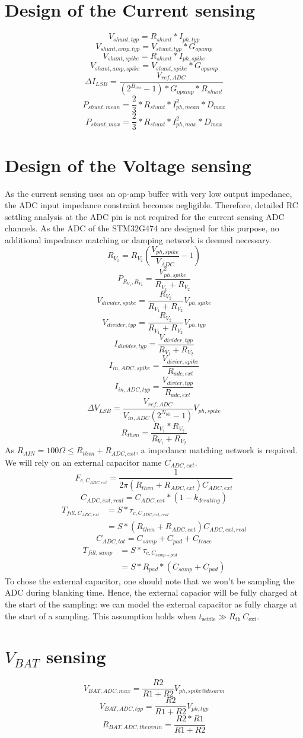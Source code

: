 \documentclass[a4paper, 10pt, conference]{IEEEtran} %
\begin{document}
 
\section{Design of the Current sensing}

\[
V_{shunt,typ} = R_{shunt} * I_{ph,typ}
\]
\[
V_{shunt,amp,typ} = V_{shunt,typ}*G_{opamp}
\]
\[
V_{shunt,spike} = R_{shunt} * I_{ph,spike}
\]
\[
V_{shunt,amp,spike} = V_{shunt,spike}*G_{opamp}
\]
\[
\Delta I_{LSB} = \frac{V_{ref,ADC}}{(2^{B_{res}}-1)*G_{opamp}*R_{shunt}}
\]
\[
P_{shunt,mean} = \frac{2}{3} * R_{shunt} * I_{ph,mean}^2 * D_{max}
\]
\[
P_{shunt,max} = \frac{2}{3} * R_{shunt} * I_{ph,max}^2 * D_{max}
\]

\section{Design of the Voltage sensing}

As the current sensing uses an op-amp buffer with very low output impedance, the ADC input impedance constraint becomes negligible. Therefore, detailed RC settling analysis at the ADC pin is not required for the current sensing ADC channels. As the ADC of the STM32G474 are designed for this purpose, no additional impedance matching or damping network is deemed necessary.
\[
R_{V_1} = R_{V_2}(\frac{V_{ph,spike}}{V_{ADC}} - 1)
\]
\[
P_{R_{V_1},R_{V_2}} = \frac{V_{ph,spike}^2}{R_{V_1}+R_{V_2}}
\]
\[
V_{divider,spike} = \frac{R_{V_2}}{R_{V_1}+R_{V_2}} V_{ph,spike}
\]
\[
V_{divider,typ} = \frac{R_{V_2}}{R_{V_1}+R_{V_2}} V_{ph,typ}
\]
\[
I_{divider,typ} = \frac{V_{divider,typ}}{R_{V_1}+R_{V_2}}
\]
\[
I_{in,ADC,spike} = \frac{V_{divier,spike}}{R_{adc,ext}}
\]
\[
I_{in,ADC,typ} = \frac{V_{divier,typ}}{R_{adc,ext}}
\]
\[
\Delta V_{LSB} = \frac{V_{ref,ADC}}{V_{in,ADC}(2^{N_{bit}}-1)}V_{ph,spike}
\]
\[
R_{thvn} = \frac{R_{V_1}*R_{V_2}}{R_{V_1}+R_{V_2}}
\]
As $R_{AIN} = 100\Omega \le R_{thvn}+R_{ADC,ext}$, a impedance matching network is required. We will rely on an external capacitor name $C_{ADC,ext}$.
\[
F_{c,C_{ADC,ext}} = \frac{1}{2\pi (R_{thvn}+R_{ADC,ext})C_{ADC,ext}}
\]
\[
C_{ADC,ext,real} = C_{ADC,ext}*(1-k_{derating})
\]
\[
\begin{aligned}
T_{fill,C_{ADC,ext}} &= S*\tau_{c,C_{ADC,ext,real}} \\
&= S*(R_{thvn}+R_{ADC,ext})C_{ADC,ext,real}
\end{aligned}
\]
\[
C_{ADC,tot} = C_{samp} + C_{pad} + C_{trace}
\]
\[
\begin{aligned}
T_{fill,samp} &= S*\tau_{c,C_{samp+pad}} \\
&= S*R_{pad}*(C_{samp}+C_{pad})
\end{aligned}
\]
To chose the external capacitor, one should note that we won't be sampling the ADC during blanking time. Hence, the external capacior will be fully charged at the start of the sampling: we can model the external capacitor as fully charge at the start of a sampling. This assumption holds when $t_{\mathrm{settle}} \gg R_{\mathrm{th}}\,C_{\mathrm{ext}}$.

\section{$V_{BAT}$ sensing}

\[
V_{BAT,ADC,max} = \frac{R2}{R1+R2} V_{ph,spike@disarm}
\]
\[
V_{BAT,ADC,typ} = \frac{R2}{R1+R2} V_{ph,typ}
\]
\[
R_{BAT,ADC,thevenin} = \frac{R2*R1}{R1+R2}
\]
\end{document}
